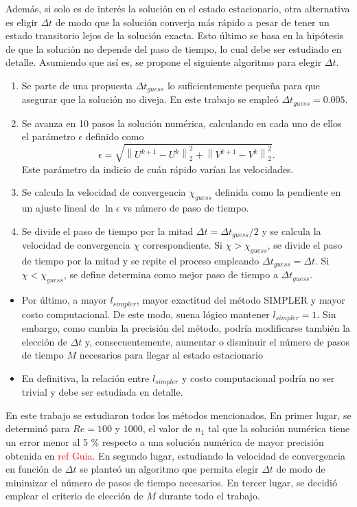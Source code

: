 \documentclass[aps,prb,twocolumn,superscriptaddress,floatfix,longbibliography,10pt]{revtex4-2}
\newif\ifptitle
\newif\ifpnumber
\newcounter{para}
\newcommand\ptitle[1]{\par\refstepcounter{para}
{\ifpnumber{\noindent\textcolor{lightgray}{\textbf{\thepara}}\indent}\fi}
{\ifptitle{\textbf{[{#1}]}}\fi}}
\begin{document}
Además, si solo es de interés la solución en el estado estacionario, otra alternativa es eligir $\Delta t$ de modo que la solución converja más rápido a pesar de tener un estado transitorio lejos de la solución exacta. Esto último se basa en la hipótesis de que la solución no depende del paso de tiempo, lo cual debe ser estudiado en detalle. Asumiendo que así es, se propone el siguiente algoritmo para elegir $\Delta t$.
\begin{enumerate}
  \item Se parte de una propuesta $\Delta t_{guess}$ lo suficientemente pequeña para que asegurar que la solución no diveja. En este trabajo se empleó $\Delta t_{guess} = 0.005.$ 
  \item Se avanza en 10 pasos la solución numérica, calculando en cada uno de ellos el parámetro $\epsilon$ definido como
  \[\epsilon = \sqrt{ \left \|U^{k+1}-U^k \right \|_2^2 +  \left \| V^{k+1} - V^k \right \|_2^2 }.\]
  Este parámetro da indicio de cuán rápido varían las velocidades.
  \item Se calcula la velocidad de convergencia $\chi_{guess}$ definida como la pendiente en un ajuste lineal de $\ln{\epsilon}$ vs número de paso de tiempo.
  \item Se divide el paso de tiempo por la mitad $\Delta t = \Delta t_{guess}/2$ y se calcula la velocidad de convergencia $\chi$ correspondiente. Si $\chi > \chi_{guess}$, se divide el paso de tiempo por la mitad y se repite el proceso empleando $ \Delta t_{guess} = \Delta t$. Si $\chi < \chi_{guess}$, se define determina como mejor paso de tiempo a $\Delta t_{guess}$.
\end{enumerate}


\ptitle{Número de pasos $l_{simpler}$}
\begin{itemize}
  \item Por último, a mayor $l_{simpler}$, mayor exactitud del método SIMPLER y mayor costo computacional. De este modo, suena lógico mantener $l_{simpler} = 1$. Sin embargo, como cambia la precisión del método, podría modificarse también la elección de $\Delta t$ y, consecuentemente, aumentar o disminuir el número de pasos de tiempo $M$ necesarios para llegar al estado estacionario
  \item En definitiva, la relación entre $l_{simpler}$ y costo computacional podría no ser trivial y debe ser estudiada en detalle.
\end{itemize}


\ptitle{Resumen de costo computacional}
En este trabajo se estudiaron todos los métodos mencionados. En primer lugar, se determinó para $Re = 100$ y $1000$, el valor de $n_1$ tal que la solución numérica tiene un error menor al 5 \% respecto a una solución numérica de mayor precisión obtenida en \textcolor{red}{ref Guia}. En segundo lugar, estudiando la velocidad de convergencia en función de $\Delta t$ se planteó un algoritmo que permita elegir $\Delta t$ de modo de minimizar el número de pasos de tiempo necesarios. En tercer lugar, se decidió emplear el criterio de elección de $M$ durante todo el trabajo.
\end{document}
